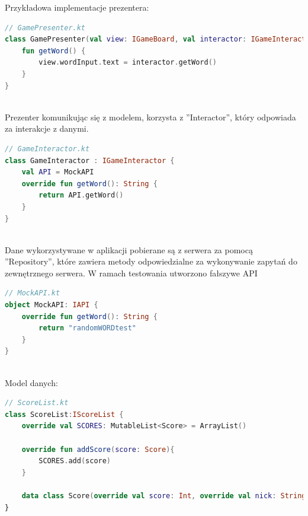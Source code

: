 \documentclass[12pt,a4paper]{article}
\begin{document}
Przykładowa implementacje prezentera:\\
\begin{lstlisting}[caption={Prezenter}, label={lst:example4}, language=Kotlin]
// GamePresenter.kt
class GamePresenter(val view: IGameBoard, val interactor: IGameInteractor){
    fun getWord() {
        view.wordInput.text = interactor.getWord()
    }
}
\end{lstlisting}\\
Prezenter komunikując się z modelem, korzysta z ''Interactor'', który odpowiada za interakcje z danymi.\\
\begin{lstlisting}[caption={Interactor}, label={lst:example5}, language=Kotlin]
// GameInteractor.kt
class GameInteractor : IGameInteractor {
    val API = MockAPI
    override fun getWord(): String {
        return API.getWord()
    }
}
\end{lstlisting}\\
Dane wykorzystywane w aplikacji pobierane są z serwera za pomocą ''Repository'', które zawiera metody odpowiedzialne za wykonywanie zapytań do zewnętrznego serwera. W ramach testowania utworzono fałszywe API\\
\begin{lstlisting}[caption={Repository}, label={lst:example6}, language=Kotlin]
// MockAPI.kt
object MockAPI: IAPI {
    override fun getWord(): String {
        return "randomWORDtest"
    }
}
\end{lstlisting}\\
Model danych: \\
\begin{lstlisting}[caption={Model Danych}, label={lst:example7}, language=Kotlin]
// ScoreList.kt
class ScoreList:IScoreList {
    override val SCORES: MutableList<Score> = ArrayList()

    override fun addScore(score: Score){
        SCORES.add(score)
    }

    data class Score(override val score: Int, override val nick: String) : IScore
}
\end{lstlisting}
\end{document}
